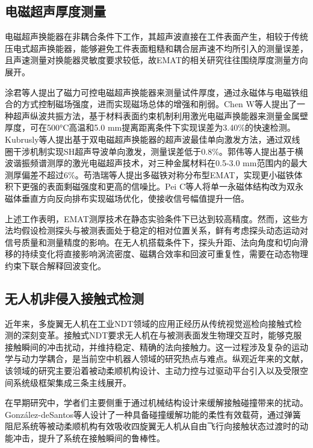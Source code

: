 \subsection{电磁超声厚度测量}

电磁超声换能器在非耦合条件下工作，其超声波直接在工件表面产生，相较于传统压电式超声换能器，能够避免工件表面粗糙和耦合层声速不均所引入的测量误差，且声速测量对换能器灵敏度要求较低，故EMAT的相关研究往往围绕厚度测量方向展开。

涂君等人提出了磁力可控电磁超声换能器来测量试件厚度，通过永磁体与电磁铁组合的方式控制磁场强度，进而实现磁场总体的增强和削弱。Chen W等人提出了一种超声纵波共振方法，基于材料表面约束机制利用激光电磁声换能器来测量金属壁厚度，可在500°C高温和5.0 mm提离距离条件下实现误差为3.40\%的快速检测。Kubrusly等人提出基于双电磁超声换能器的超声波最佳单向激发方法，通过双线圈干涉机制实现SH超声导波单向激发，测量误差低于0.8\%。郭伟等人提出基于横波谐振频谱测厚的激光电磁超声技术，对三种金属材料在0.5-3.0 mm范围内的最大测厚偏差不超过6\%。苟浩瑞等人提出多磁铁对称分布型EMAT，实现更小磁铁体积下更强的表面剩磁强度和更高的信噪比。Pei C等人将单一永磁体结构改为双永磁体垂直方向反向排布实现磁场优化，使接收信号幅值提升一倍。

上述工作表明，EMAT测厚技术在静态实验条件下已达到较高精度。然而，这些方法均假设检测探头与被测表面处于稳定的相对位置关系，鲜有考虑探头动态运动对信号质量和测量精度的影响。在无人机搭载条件下，探头升距、法向角度和切向滑移的持续变化将直接影响涡流密度、磁耦合效率和回波可重复性，需要在动态物理约束下联合解释回波变化。

\subsection{无人机非侵入接触式检测}

近年来，多旋翼无人机在工业NDT领域的应用正经历从传统视觉巡检向接触式检测的深刻变革。接触式NDT要求无人机在与被测表面发生物理交互时，能够克服接触瞬间的冲击扰动，并维持稳定、精确的法向接触力。这一过程涉及复杂的运动学与动力学耦合，是当前空中机器人领域的研究热点与难点。纵观近年来的文献，该领域的研究主要沿着被动柔顺机构设计、主动力控与过驱动平台引入以及受限空间系统级框架集成三条主线展开。

在早期研究中，学者们主要侧重于通过机械结构设计来缓解接触碰撞带来的扰动。Gonz\'{a}lez-deSantos等人设计了一种具备碰撞缓解功能的柔性有效载荷，通过弹簧阻尼系统等被动柔顺机构有效吸收四旋翼无人机从自由飞行向接触状态过渡时的动能冲击，提升了系统在接触瞬间的鲁棒性。

